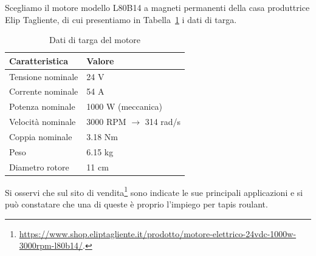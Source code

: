 \documentclass[a4paper,12pt]{article}
\begin{document}
\vspace{0.5em} 

Scegliamo il motore modello L80B14 a magneti permanenti della casa produttrice Elip Tagliente, di cui presentiamo in Tabella~\ref{tab: datiTargaMotore} i dati di targa.

\vspace{0.3em} 

\begin{table}[h!]
    \centering
    \begin{tabular}{|l|l|}
    \hline
    \textbf{Caratteristica} & \textbf{Valore} \\ \hline
    Tensione nominale & 24 V \\ \hline
    Corrente nominale & 54 A \\ \hline
    Potenza nominale & 1000 W (meccanica) \\ \hline
    Velocità nominale & 3000 RPM \(\rightarrow\) 314 rad/s \\ \hline
    Coppia nominale & 3.18 Nm \\ \hline
    Peso & 6.15 kg \\ \hline
    Diametro rotore & 11 cm \\ \hline
    \end{tabular}
    \caption{Dati di targa del motore}
    \label{tab: datiTargaMotore}
\end{table}

\vspace{0.5em} 

Si osservi che sul sito di vendita\footnote{\url{https://www.shop.eliptagliente.it/prodotto/motore-elettrico-24vdc-1000w-3000rpm-l80b14/}.} sono indicate le sue principali applicazioni e si può constatare che una di queste è proprio l'impiego per tapis roulant.
\end{document}
